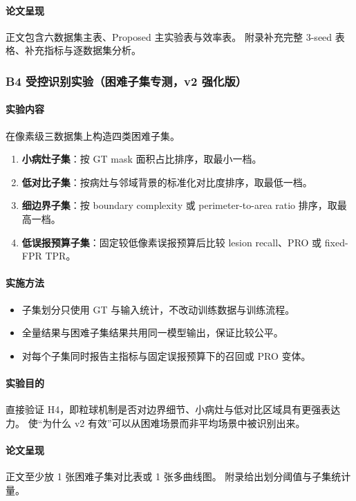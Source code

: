 \documentclass[UTF8,a4paper]{ctexart}
\begin{document}
\paragraph{论文呈现}
正文包含六数据集主表、Proposed 主实验表与效率表。
附录补充完整 3-seed 表格、补充指标与逐数据集分析。

\subsubsection{B4 受控识别实验（困难子集专测，v2 强化版）}

\paragraph{实验内容}
在像素级三数据集上构造四类困难子集。
\begin{enumerate}
  \item \textbf{小病灶子集}：按 GT mask 面积占比排序，取最小一档。
  \item \textbf{低对比子集}：按病灶与邻域背景的标准化对比度排序，取最低一档。
  \item \textbf{细边界子集}：按 boundary complexity 或 perimeter-to-area ratio 排序，取最高一档。
  \item \textbf{低误报预算子集}：固定较低像素误报预算后比较 lesion recall、PRO 或 fixed-FPR TPR。
\end{enumerate}

\paragraph{实施方法}
\begin{itemize}
  \item 子集划分只使用 GT 与输入统计，不改动训练数据与训练流程。
  \item 全量结果与困难子集结果共用同一模型输出，保证比较公平。
  \item 对每个子集同时报告主指标与固定误报预算下的召回或 PRO 变体。
\end{itemize}

\paragraph{实验目的}
直接验证 H4，即粒球机制是否对边界细节、小病灶与低对比区域具有更强表达力。
使“为什么 v2 有效”可以从困难场景而非平均场景中被识别出来。

\paragraph{论文呈现}
正文至少放 1 张困难子集对比表或 1 张多曲线图。
附录给出划分阈值与子集统计量。
\end{document}
